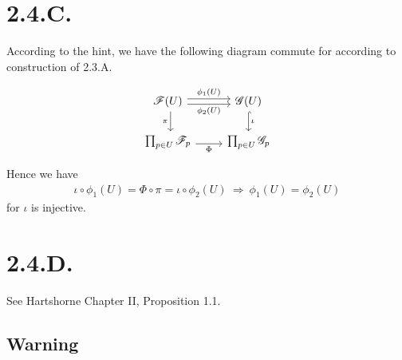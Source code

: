 \section{2.4.C.}\label{2.4.C.}

According to the hint, we have the following diagram commute for according to construction of 2.3.A.

\[\begin{tikzcd}
	{\mathscr F(U)} & {\mathscr G(U)} \\
	{\prod_{p\in U}\mathscr F_p} & {\prod_{p\in U}\mathscr G_p}
	\arrow["{\phi_1(U)}", shift left, from=1-1, to=1-2]
	\arrow["{\phi_2(U)}"', shift right, from=1-1, to=1-2]
	\arrow["\iota", hook, from=1-2, to=2-2]
	\arrow["\Phi"', shift right, from=2-1, to=2-2]
	\arrow["\pi"', shift left, from=1-1, to=2-1]
\end{tikzcd}\]

Hence we have 
\begin{align*}
	\iota\circ\phi_1(U)=\Phi\circ\pi=\iota\circ\phi_2(U)
	~\Rightarrow~ \phi_1(U)=\phi_2(U)
\end{align*}for $\iota$ is injective. 

\section{2.4.D.}

See Hartshorne \cite{hartshorne2013algebraic} Chapter II, Proposition 1.1.

\subsection{Warning}

